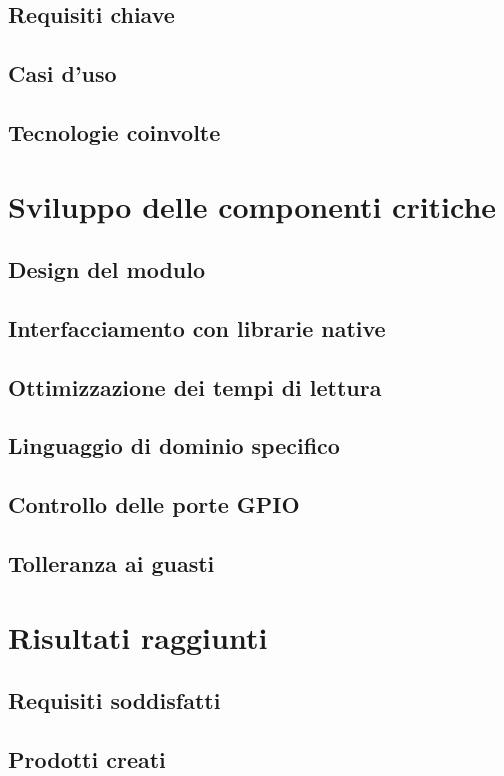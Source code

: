 \subsection{Requisiti chiave}
\subsection{Casi d'uso}
\subsection{Tecnologie coinvolte}



\section{Sviluppo delle componenti critiche}
\subsection{Design del modulo}
\subsection{Interfacciamento con librarie native}
\subsection{Ottimizzazione dei tempi di lettura}
\subsection{Linguaggio di dominio specifico}
\subsection{Controllo delle porte GPIO}
\subsection{Tolleranza ai guasti}


\section{Risultati raggiunti}
\subsection{Requisiti soddisfatti}
\subsection{Prodotti creati}